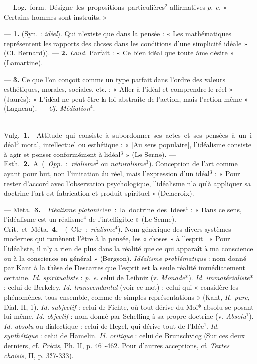 
	\begin{itemize}[leftmargin=1cm, label=, itemsep=1pt]


 — \si{Log.} \si{form.} Désigne les propositions particulières$^2$
affirmatives {\it p. e.} « Certains hommes sont instruits. »

 — {\bf 1.} (Syn. : {\it idéel}). Qui n'existe que dans la
pensée : « Les mathématiques représentent les rapports des choses dans les
conditions d'une simplicité idéale » (Cl. Bernard)). — {\bf 2.} {\it Laud.}
Parfait : « Ce bien idéal que toute âme désire » (Lamartine).

 — {\bf 3.} Ce que l’on conçoit comme un type parfait dans
l’ordre des valeurs esthétiques, morales, sociales, etc. : « Aller à l'idéal
et comprendre le réel » (Jaurès); « L'idéal ne peut être la loi abstraite
de l’action, mais l’action même » (Lagneau). — {\it Cf.} {\it Médiation}$^4$.

 — \si{Vulg.} {\bf 1.}  Attitude qui consiste à
subordonner ses actes et ses pensées à un idéal$^3$ moral, intellectuel ou
esthétique : « [Au sens populaire], l’idéalisme consiste à agir et penser
conformément à lidéal$^3$ » (Le Senne). — \si{Esth.} {\bf 2.} A ({\it Opp.} :
{\it réalisme}$^2$ ou {\it naturalisme}$^3$). Conception de l’art comme ayant
pour but, non l’imitation du réel, mais l'expression d’un idéal$^3$ : « Pour
rester d'accord avec l'observation psychologique, l’idéalisme n’a qu’à
appliquer sa doctrine l’art est fabrication et produit
spirituel » (Delacroix).

— \si{Méta.} {\bf 3.}  {\it Idéalisme platonicien} : la
doctrine des Idées$^1$ : « Dans ce sens, l’idéalisme est un réalisme$^4$ de
l’intelligible » (Le Senne). — \si{Crit.} et \si{Méta.} {\bf 4.}  (Ctr. : {\it réalisme}$^4$). Nom générique des divers systèmes
modernes qui ramènent l'être à la pensée, les « choses » à l'esprit : « Pour
l’idéaliste, il n’y a rien de plus dans la
réalité que ce qui apparaît à {\it }ma conscience ou à la conscience en
général » (Bergson). {\it Idéalisme problématique} : nom donné par Kant à la
thèse de Descartes que l'esprit est la seule réalité immédiatement certaine.
{\it Id. spiritualiste} : {\it p. e.} celui de Leibniz (v. {\it Monade}*).
{\it Id. immatérialiste}* : celui de Berkeley. {\it Id. transcendantal}
(voir ce mot) : celui qui « considère les phénomènes, tous ensemble, comme
de simples représentations » (Kant, {\it R. pure}, Dial. II, 1). {\it Id.
subjectif} : celui de Fichte, où tout dérive du Moi* absolu se posant
lui-même. {\it Id. objectif} : nom donné par Schelling à sa propre doctrine
(v. {\it Absolu}$^1$). {\it Id. absolu} ou dialectique : celui de Hegel, qui
dérive tout de l’Idée$^1$. {\it Id. synthétique} : celui de Hamelin.
{\it Id. critique} : celui de Brunschvicg (Sur ces deux derniers, cf.
{\it Précis}, Ph. II, p. 461-462. Pour d’autres acceptions, cf.
{\it Textes choisis}, II, p. 327-333).


\end{itemize}
